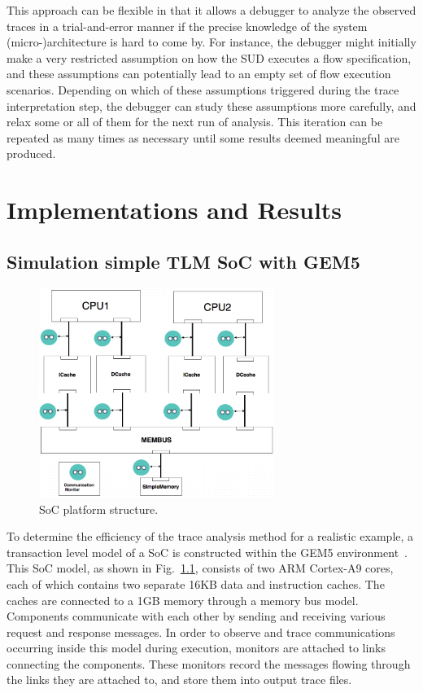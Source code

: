 \documentclass[12pt,frontmatter,copyright,thesis]{usfmanus}
\begin{document}
This approach can be flexible in that it allows a debugger
to analyze the observed traces in a trial-and-error manner
if the precise knowledge of the system (micro-)architecture
is hard to come by.  For instance, the debugger might
initially make a very restricted assumption on how the SUD
executes a flow specification, and these assumptions can
potentially lead to an empty set of flow execution
scenarios.  Depending on which of these assumptions
triggered during the trace interpretation step, the debugger
can study these assumptions more carefully, and relax some
or all of them for the next run of analysis.  This iteration
can be repeated as many times as necessary until some
results deemed meaningful are produced.




\chapter{Implementations and Results}

\section{Simulation simple TLM SoC with GEM5}
\begin{figure} 
\centerline{
\includegraphics[width=3in]{figures/Fig4.png}}
\caption{SoC platform structure.}
\label{SoC}
\end{figure}

To determine the efficiency of the trace analysis method for
a realistic example, a transaction level model of a SoC is
constructed within the GEM5 environment~\cite{Binkert2011}.
This SoC model, as shown in Fig.~\ref{SoC}, consists of two
ARM Cortex-A9 cores, each of which contains two separate
16KB data and instruction caches.  The caches are connected
to a 1GB memory through a memory bus model.  Components
communicate with each other by sending and receiving various
request and response messages.  In order to observe and
trace communications occurring inside this model during
execution, monitors are attached to links connecting the
components.  These monitors record the messages flowing
through the links they are attached to, and store them into
output trace files.
\end{document}
